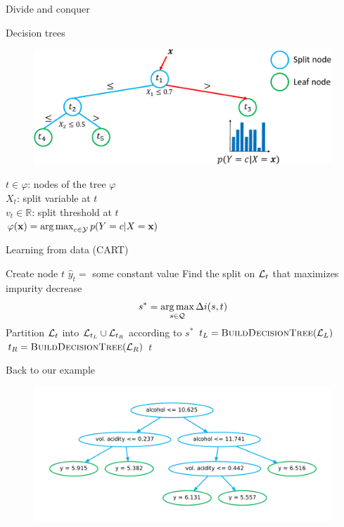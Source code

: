 \documentclass{beamer}
\DeclareMathOperator*{\argmax}{arg\,max}
\begin{document}
\begin{frame}{Divide and conquer}
\begin{figure}
\end{figure}
\end{frame}

\begin{frame}{Decision trees}
\begin{figure}
\includegraphics[scale=0.5]{./figures/tree-simple.pdf}
\end{figure}

$t \in \varphi$: nodes of the tree $\varphi$\\
$X_t$: split variable at $t$ \\
$v_t \in \mathbb{R}$: split threshold at $t$\\
$\varphi(\mathbf{x}) = \argmax_{c \in {\cal Y}} p(Y = c | X = \mathbf{x})$
\end{frame}

\begin{frame}[fragile]{Learning from data {\scriptsize (CART)}}

\begin{algorithmic}
    \State Create node $t$
        \State $\widehat{y}_{t} =$ some constant value
    \Else
        \State Find the split on ${\cal L}_t$ that maximizes impurity decrease $$s^* = \argmax_{s \in {\cal Q}} \Delta i(s, t)$$
        \State Partition ${\cal L}_t$ into ${\cal L}_{t_L} \cup {\cal L}_{t_R}$ according to $s^*$
        \State $t_L = \Call{BuildDecisionTree}{{\cal L}_{L}}$
        \State $t_R = \Call{BuildDecisionTree}{{\cal L}_{R}}$
    \EndIf
    \State \Return $t$
\EndFunction
\end{algorithmic}

\end{frame}

\begin{frame}{Back to our example}
\begin{figure}
\includegraphics[scale=0.4]{./figures/tree-wine.pdf}
\end{figure}
\end{frame}
\end{document}
